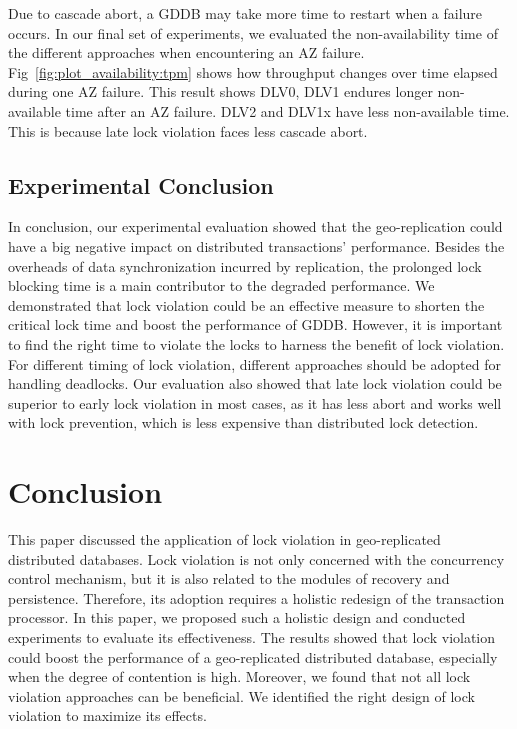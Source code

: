 \documentclass[conference]{IEEEtran}
\begin{document}
Due to cascade abort, a GDDB may take more time to restart when a failure occurs.
In our final set of experiments, we evaluated the non-availability time of the different approaches when encountering an AZ failure.
Fig~\ref{fig:plot_availability:tpm} shows how throughput changes over time elapsed during one AZ failure.
This result shows DLV0, DLV1 endures longer non-available time after an AZ failure.
DLV2 and DLV1x have less non-available time. This is because late lock violation faces less cascade abort.
\fi

\subsection{Experimental Conclusion}

In conclusion, our experimental evaluation showed that the geo-replication could have a big negative impact on distributed transactions' performance.
Besides the overheads of data synchronization incurred by replication, the prolonged lock blocking time is a main contributor to the degraded performance.
We demonstrated that lock violation could be an effective measure to shorten the critical lock time and boost the performance of GDDB.
However, it is important to find the right time to violate the locks to harness the benefit of lock violation.
For different timing of lock violation, different approaches should be adopted for handling deadlocks.
Our evaluation also showed that late lock violation could be superior to early lock violation in most cases, as it has less abort and works well with lock prevention, which is less expensive than distributed lock detection.


\section{Conclusion}
\label{sec:conclusion}

This paper discussed the application of lock violation in geo-replicated distributed databases.
Lock violation is not only concerned with the concurrency control mechanism, but it is also related to the modules of recovery and persistence.
Therefore, its adoption requires a holistic redesign of the transaction processor.
In this paper, we proposed such a holistic design and conducted experiments to evaluate its effectiveness.
The results showed that lock violation could boost the performance of a geo-replicated distributed database, especially when the degree of contention is high.
Moreover, we found that not all lock violation approaches can be beneficial. We identified the right design of lock violation to maximize its effects.
\end{document}
